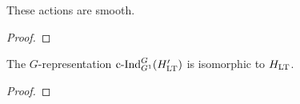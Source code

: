 \documentclass[../main.tex]{subfiles}
\begin{document}
\begin{lem}\label{lem:GActsSmoothlyOnHLT}
  These actions are smooth.
  \begin{proof}
  \end{proof}
\end{lem}

\begin{lem}\label{lem:InductionStatementOnHLT}
  The $G$-representation $\mathrm{c\text{-}Ind}_{G^1}^G (H'_{\mathrm{LT}})$ is isomorphic to $H_{\mathrm{LT}}$. 
\begin{proof}
\end{proof}
\end{lem}


\end{document}
